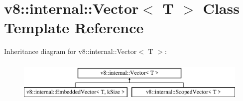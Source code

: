 \hypertarget{classv8_1_1internal_1_1_vector}{}\section{v8\+:\+:internal\+:\+:Vector$<$ T $>$ Class Template Reference}
\label{classv8_1_1internal_1_1_vector}
Inheritance diagram for v8\+:\+:internal\+:\+:Vector$<$ T $>$\+:\begin{figure}[H]
\begin{center}
\leavevmode
\includegraphics[height=2.000000cm]{classv8_1_1internal_1_1_vector}
\end{center}
\end{figure}
